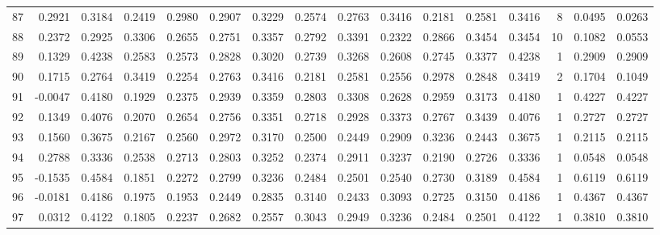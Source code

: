 \begin{tabular}{lrrrrrrrrrrrrrrr}
87  &      0.2921 &  0.3184 &  0.2419 &  0.2980 &  0.2907 &  0.3229 &  0.2574 &  0.2763 &  0.3416 &  0.2181 &   0.2581 &     0.3416 &      8 &                    0.0495 &                     0.0263 \\
88  &      0.2372 &  0.2925 &  0.3306 &  0.2655 &  0.2751 &  0.3357 &  0.2792 &  0.3391 &  0.2322 &  0.2866 &   0.3454 &     0.3454 &     10 &                    0.1082 &                     0.0553 \\
89  &      0.1329 &  0.4238 &  0.2583 &  0.2573 &  0.2828 &  0.3020 &  0.2739 &  0.3268 &  0.2608 &  0.2745 &   0.3377 &     0.4238 &      1 &                    0.2909 &                     0.2909 \\
90  &      0.1715 &  0.2764 &  0.3419 &  0.2254 &  0.2763 &  0.3416 &  0.2181 &  0.2581 &  0.2556 &  0.2978 &   0.2848 &     0.3419 &      2 &                    0.1704 &                     0.1049 \\
91  &     -0.0047 &  0.4180 &  0.1929 &  0.2375 &  0.2939 &  0.3359 &  0.2803 &  0.3308 &  0.2628 &  0.2959 &   0.3173 &     0.4180 &      1 &                    0.4227 &                     0.4227 \\
92  &      0.1349 &  0.4076 &  0.2070 &  0.2654 &  0.2756 &  0.3351 &  0.2718 &  0.2928 &  0.3373 &  0.2767 &   0.3439 &     0.4076 &      1 &                    0.2727 &                     0.2727 \\
93  &      0.1560 &  0.3675 &  0.2167 &  0.2560 &  0.2972 &  0.3170 &  0.2500 &  0.2449 &  0.2909 &  0.3236 &   0.2443 &     0.3675 &      1 &                    0.2115 &                     0.2115 \\
94  &      0.2788 &  0.3336 &  0.2538 &  0.2713 &  0.2803 &  0.3252 &  0.2374 &  0.2911 &  0.3237 &  0.2190 &   0.2726 &     0.3336 &      1 &                    0.0548 &                     0.0548 \\
95  &     -0.1535 &  0.4584 &  0.1851 &  0.2272 &  0.2799 &  0.3236 &  0.2484 &  0.2501 &  0.2540 &  0.2730 &   0.3189 &     0.4584 &      1 &                    0.6119 &                     0.6119 \\
96  &     -0.0181 &  0.4186 &  0.1975 &  0.1953 &  0.2449 &  0.2835 &  0.3140 &  0.2433 &  0.3093 &  0.2725 &   0.3150 &     0.4186 &      1 &                    0.4367 &                     0.4367 \\
97  &      0.0312 &  0.4122 &  0.1805 &  0.2237 &  0.2682 &  0.2557 &  0.3043 &  0.2949 &  0.3236 &  0.2484 &   0.2501 &     0.4122 &      1 &                    0.3810 &                     0.3810 \\

\end{tabular}
